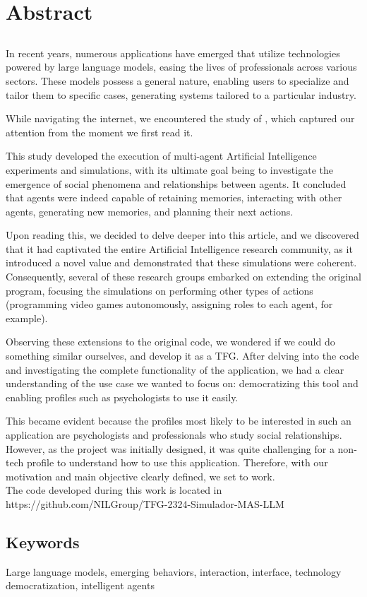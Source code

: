\chapter*{Abstract}

\section*{\tituloPortadaEngVal}

In recent years, numerous applications have emerged that utilize technologies powered by large language models, easing the lives of professionals across various sectors. These models possess a general nature, enabling users to specialize and tailor them to specific cases, generating systems tailored to a particular industry.

While navigating the internet, we encountered the study of \ga \citep{park2023generative}, which captured our attention from the moment we first read it.

This study developed the execution of multi-agent Artificial Intelligence experiments and simulations, with its ultimate goal being to investigate the emergence of social phenomena and relationships between agents. It concluded that agents were indeed capable of retaining memories, interacting with other agents, generating new memories, and planning their next actions.

Upon reading this, we decided to delve deeper into this article, and we discovered that it had captivated the entire Artificial Intelligence research community, as it introduced a novel value and demonstrated that these simulations were coherent. Consequently, several of these research groups embarked on extending the original program, focusing the simulations on performing other types of actions (programming video games autonomously, assigning roles to each agent, for example).

Observing these extensions to the original code, we wondered if we could do something similar ourselves, and develop it as a TFG. After delving into the code and investigating the complete functionality of the application, we had a clear understanding of the use case we wanted to focus on: democratizing this tool and enabling profiles such as psychologists to use it easily.

This became evident because the profiles most likely to be interested in such an application are psychologists and professionals who study social relationships. However, as the project was initially designed, it was quite challenging for a non-tech profile to understand how to use this application. Therefore, with our motivation and main objective clearly defined, we set to work.\\[0.1em]

The code developed during this work is located in https://github.com/NILGroup/TFG-2324-Simulador-MAS-LLM


\section*{Keywords}

\noindent Large language models, emerging behaviors, interaction, interface, technology democratization, intelligent agents



